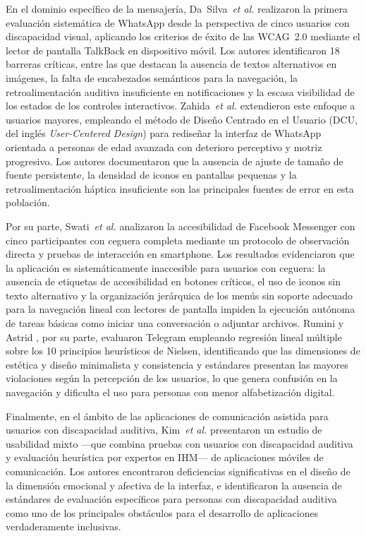 \documentclass[journal]{IEEEtran}
\begin{document}
	En el dominio espec\'ifico de la mensajer\'ia, Da~Silva~\textit{et al.} \cite{dasilva2016} realizaron la primera evaluaci\'on sistem\'atica de WhatsApp desde la perspectiva de cinco usuarios con discapacidad visual, aplicando los criterios de \'exito de las WCAG~2.0 mediante el lector de pantalla TalkBack en dispositivo m\'ovil. Los autores identificaron 18 barreras cr\'iticas, entre las que destacan la ausencia de textos alternativos en im\'agenes, la falta de encabezados sem\'anticos para la navegaci\'on, la retroalimentaci\'on auditiva insuficiente en notificaciones y la escasa visibilidad de los estados de los controles interactivos. Zahida~\textit{et al.} \cite{zahida2021} extendieron este enfoque a usuarios mayores, empleando el m\'etodo de Dise\~no Centrado en el Usuario (DCU, del ingl\'es \textit{User-Centered Design}) para redise\~nar la interfaz de WhatsApp orientada a personas de edad avanzada con deterioro perceptivo y motriz progresivo. Los autores documentaron que la ausencia de ajuste de tama\~no de fuente persistente, la densidad de iconos en pantallas pequenas y la retroalimentaci\'on h\'aptica insuficiente son las principales fuentes de error en esta poblaci\'on.
	
	Por su parte, Swati~\textit{et al.} \cite{swati2021} analizaron la accesibilidad de Facebook Messenger con cinco participantes con ceguera completa mediante un protocolo de observaci\'on directa y pruebas de interacci\'on en smartphone. Los resultados evidenciaron que la aplicaci\'on es sistem\'aticamente inaccesible para usuarios con ceguera: la ausencia de etiquetas de accesibilidad en botones cr\'iticos, el uso de iconos sin texto alternativo y la organizaci\'on jer\'arquica de los men\'us sin soporte adecuado para la navegaci\'on lineal con lectores de pantalla impiden la ejecuci\'on aut\'onoma de tareas b\'asicas como iniciar una conversaci\'on o adjuntar archivos. Rumini y Astrid \cite{rumini2019}, por su parte, evaluaron Telegram empleando regresi\'on lineal m\'ultiple sobre los 10 principios heur\'isticos de Nielsen, identificando que las dimensiones de est\'etica y dise\~no minimalista y consistencia y est\'andares presentan las mayores violaciones seg\'un la percepci\'on de los usuarios, lo que genera confusi\'on en la navegaci\'on y dificulta el uso para personas con menor alfabetizaci\'on digital.
	
	Finalmente, en el \'ambito de las aplicaciones de comunicaci\'on asistida para usuarios con discapacidad auditiva, Kim~\textit{et al.} \cite{kim2024} presentaron un estudio de usabilidad mixto ---que combina pruebas con usuarios con discapacidad auditiva y evaluaci\'on heur\'istica por expertos en IHM--- de aplicaciones m\'oviles de comunicaci\'on. Los autores encontraron deficiencias significativas en el dise\~no de la dimensi\'on emocional y afectiva de la interfaz, e identificaron la ausencia de est\'andares de evaluaci\'on espec\'ificos para personas con discapacidad auditiva como uno de los principales obst\'aculos para el desarrollo de aplicaciones verdaderamente inclusivas.
	
\end{document}
